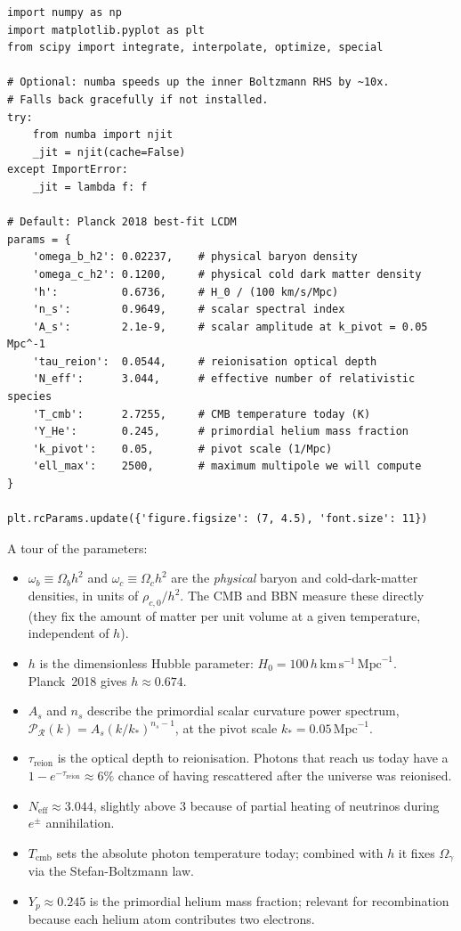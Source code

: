 \begin{codebox}[Cell 1]
\begin{lstlisting}[style=python]
import numpy as np
import matplotlib.pyplot as plt
from scipy import integrate, interpolate, optimize, special

# Optional: numba speeds up the inner Boltzmann RHS by ~10x.
# Falls back gracefully if not installed.
try:
    from numba import njit
    _jit = njit(cache=False)
except ImportError:
    _jit = lambda f: f

# Default: Planck 2018 best-fit LCDM
params = {
    'omega_b_h2': 0.02237,    # physical baryon density
    'omega_c_h2': 0.1200,     # physical cold dark matter density
    'h':          0.6736,     # H_0 / (100 km/s/Mpc)
    'n_s':        0.9649,     # scalar spectral index
    'A_s':        2.1e-9,     # scalar amplitude at k_pivot = 0.05 Mpc^-1
    'tau_reion':  0.0544,     # reionisation optical depth
    'N_eff':      3.044,      # effective number of relativistic species
    'T_cmb':      2.7255,     # CMB temperature today (K)
    'Y_He':       0.245,      # primordial helium mass fraction
    'k_pivot':    0.05,       # pivot scale (1/Mpc)
    'ell_max':    2500,       # maximum multipole we will compute
}

plt.rcParams.update({'figure.figsize': (7, 4.5), 'font.size': 11})
\end{lstlisting}
\end{codebox}

A tour of the parameters:

\begin{itemize}
  \item $\omega_b \equiv \Omega_b h^2$ and $\omega_c \equiv \Omega_c h^2$ are the \emph{physical} baryon and cold-dark-matter densities, in units of $\rho_{c,0}/h^2$. The CMB and BBN measure these directly (they fix the amount of matter per unit volume at a given temperature, independent of $h$).
  \item $h$ is the dimensionless Hubble parameter: $H_0 = 100\, h\,\mathrm{km}\,\mathrm{s}^{-1}\,\mathrm{Mpc}^{-1}$. Planck~2018 gives $h \approx 0.674$.
  \item $A_s$ and $n_s$ describe the primordial scalar curvature power spectrum, $\mathcal{P}_\mathcal{R}(k) = A_s (k/k_*)^{n_s - 1}$, at the pivot scale $k_* = 0.05\,\mathrm{Mpc}^{-1}$.
  \item $\tau_\mathrm{reion}$ is the optical depth to reionisation. Photons that reach us today have a $1 - e^{-\tau_\mathrm{reion}} \approx 6\%$ chance of having rescattered after the universe was reionised.
  \item $N_\mathrm{eff} \approx 3.044$, slightly above $3$ because of partial heating of neutrinos during $e^\pm$ annihilation.
  \item $T_\mathrm{cmb}$ sets the absolute photon temperature today; combined with $h$ it fixes $\Omega_\gamma$ via the Stefan-Boltzmann law.
  \item $Y_p \approx 0.245$ is the primordial helium mass fraction; relevant for recombination because each helium atom contributes two electrons.
\end{itemize}

